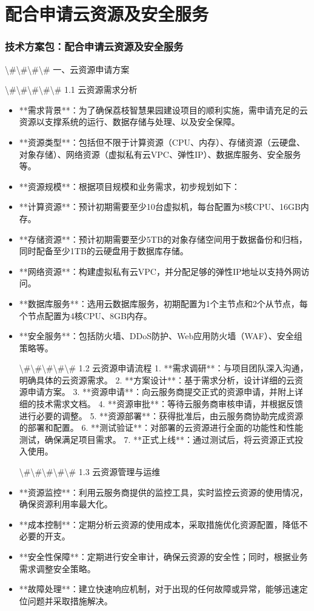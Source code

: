 \documentclass[UTF8,a4paper,zihao=-4]{ctexart}
\begin{document}
\section{配合申请云资源及安全服务}

\subsubsection{技术方案包：配合申请云资源及安全服务}

\textbackslash{}#\textbackslash{}#\textbackslash{}#\textbackslash{}# 一、云资源申请方案

\textbackslash{}#\textbackslash{}#\textbackslash{}#\textbackslash{}#\textbackslash{}# 1.1 云资源需求分析
\begin{itemize}
\item **需求背景**：为了确保荔枝智慧果园建设项目的顺利实施，需申请充足的云资源以支撑系统的运行、数据存储与处理、以及安全保障。
\item **资源类型**：包括但不限于计算资源（CPU、内存）、存储资源（云硬盘、对象存储）、网络资源（虚拟私有云VPC、弹性IP）、数据库服务、安全服务等。
\item **资源规模**：根据项目规模和业务需求，初步规划如下：
\item **计算资源**：预计初期需要至少10台虚拟机，每台配置为8核CPU、16GB内存。
\item **存储资源**：预计初期需要至少5TB的对象存储空间用于数据备份和归档，同时配备至少1TB的云硬盘用于数据库存储。
\item **网络资源**：构建虚拟私有云VPC，并分配足够的弹性IP地址以支持外网访问。
\item **数据库服务**：选用云数据库服务，初期配置为1个主节点和2个从节点，每个节点配置为4核CPU、8GB内存。
\item **安全服务**：包括防火墙、DDoS防护、Web应用防火墙（WAF）、安全组策略等。

\textbackslash{}#\textbackslash{}#\textbackslash{}#\textbackslash{}#\textbackslash{}# 1.2 云资源申请流程
1. **需求调研**：与项目团队深入沟通，明确具体的云资源需求。
2. **方案设计**：基于需求分析，设计详细的云资源申请方案。
3. **资源申请**：向云服务商提交正式的资源申请，并附上详细的技术需求文档。
4. **资源审批**：等待云服务商审核申请，并根据反馈进行必要的调整。
5. **资源部署**：获得批准后，由云服务商协助完成资源的部署和配置。
6. **测试验证**：对部署的云资源进行全面的功能性和性能测试，确保满足项目需求。
7. **正式上线**：通过测试后，将云资源正式投入使用。

\textbackslash{}#\textbackslash{}#\textbackslash{}#\textbackslash{}#\textbackslash{}# 1.3 云资源管理与运维
\item **资源监控**：利用云服务商提供的监控工具，实时监控云资源的使用情况，确保资源利用率最大化。
\item **成本控制**：定期分析云资源的使用成本，采取措施优化资源配置，降低不必要的开支。
\item **安全性保障**：定期进行安全审计，确保云资源的安全性；同时，根据业务需求调整安全策略。
\item **故障处理**：建立快速响应机制，对于出现的任何故障或异常，能够迅速定位问题并采取措施解决。


\end{itemize}
\end{document}
